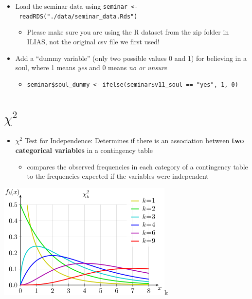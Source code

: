 \documentclass[
]{book}
\providecommand{\tightlist}{%
  \setlength{\itemsep}{0pt}\setlength{\parskip}{0pt}}
\begin{document}
\begin{itemize}
\tightlist
\item
  Load the seminar data using \texttt{seminar\ \textless{}-\ readRDS("./data/seminar\_data.Rds")}

  \begin{itemize}
  \tightlist
  \item
    Please make sure you are using the R dataset from the
    zip folder in ILIAS, not the original csv file we first used!
  \end{itemize}
\item
  Add a ``dummy variable'' (only two possible values 0 and 1)
  for believing in a soul, where 1 means \emph{yes} and 0 means \emph{no or unsure}

  \begin{itemize}
  \tightlist
  \item
    \texttt{seminar\$soul\_dummy\ \textless{}-}
    \texttt{ifelse(seminar\$v11\_soul\ ==\ "yes",\ 1,\ 0)}
  \end{itemize}
\end{itemize}

\section{\texorpdfstring{\(\chi^2\)}{\textbackslash chi\^{}2}}\label{chi2}

\begin{itemize}
\tightlist
\item
  \(\chi^2\) Test for Independence: Determines if there is an association between \textbf{two categorical variables} in a contingency table

  \begin{itemize}
  \tightlist
  \item
    compares the observed frequencies in each category of a contingency table to the frequencies expected if the variables were independent
  \end{itemize}
\end{itemize}

\includegraphics{./img/chidist.png}k
\end{document}

